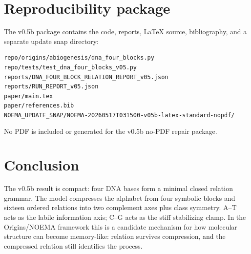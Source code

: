 \documentclass[11pt]{article}
\begin{document}
\section{Reproducibility package}
The v0.5b package contains the code, reports, LaTeX source, bibliography, and a separate update snap directory:
\begin{verbatim}
repo/origins/abiogenesis/dna_four_blocks.py
repo/tests/test_dna_four_blocks_v05.py
reports/DNA_FOUR_BLOCK_RELATION_REPORT_v05.json
reports/RUN_REPORT_v05.json
paper/main.tex
paper/references.bib
NOEMA_UPDATE_SNAP/NOEMA-20260517T031500-v05b-latex-standard-nopdf/
\end{verbatim}
No PDF is included or generated for the v0.5b no-PDF repair package.

\section{Conclusion}
The v0.5b result is compact: four DNA bases form a minimal closed relation grammar. The model compresses the alphabet from four symbolic blocks and sixteen ordered relations into two complement axes plus class symmetry. A--T acts as the labile information axis; C--G acts as the stiff stabilizing clamp. In the Origins/NOEMA framework this is a candidate mechanism for how molecular structure can become memory-like: relation survives compression, and the compressed relation still identifies the process.



\end{document}
